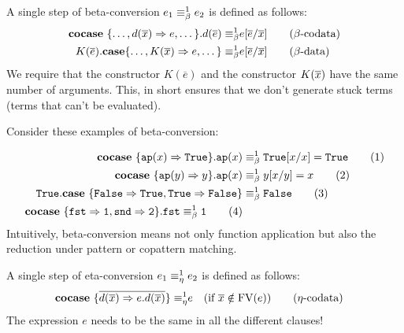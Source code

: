 \documentclass[twoside,12pt,a4paper]{article}
\begin{document}
\begin{definition} \label{sec:betaconv}
    A single step of beta-conversion $e_1 \equiv_{\beta}^1 e_2$ is defined as follows:
    \begin{align*}
        \textbf{cocase}\ \{\dots,d(\overline{x}) \Rightarrow e, \dots\}.d(\overline{e})
        \equiv_{\beta}^1 & e[\overline{e}/\overline{x}]  
        \tag{$\beta$-codata}\\
        K(\overline{e}).\textbf{case}\{\dots,K(\overline{x})\Rightarrow e,\dots\}
        \equiv_{\beta}^1 & e[\overline{e}/\overline{x}] 
        \tag{$\beta$-data}
    \end{align*}
    We require that the constructor $K(\overline{e})$ and the constructor $K(\overline{x})$ have the same number of arguments.
    This, in short ensures that we don't generate stuck terms (terms that can't be evaluated).
\end{definition}
Consider these examples of beta-conversion:
\begin{example}
    \begin{align*}
        \textbf{cocase}\ \{\texttt{ap}(x)\Rightarrow \mathtt{True}\}.\texttt{ap}(x)&\equiv_{\beta}^1 \mathtt{True}[x/x] = \mathtt{True} 
        \tag{1}\\
        \textbf{cocase}\ \{\texttt{ap}(y)\Rightarrow y\}.\texttt{ap}(x) &\equiv_{\beta}^1 y[x/y]= x
        \tag{2}\\
        \mathtt{True}.\textbf{case}\ \{\mathtt{False}\Rightarrow \mathtt{True}, \mathtt{True} \Rightarrow \mathtt{False}\}&\equiv_{\beta}^1\mathtt{False}
        \tag{3}\\
        \textbf{cocase}\ \{\mathtt{fst\Rightarrow 1, snd\Rightarrow 2}\}.\mathtt{fst}\equiv_{\beta}^1 \mathtt{1}
        \tag{4}
    \end{align*}
    Intuitively, beta-conversion means not only function application but also the reduction under pattern or copattern matching. %
\end{example}

\begin{definition}
    A single step of eta-conversion $e_1 \equiv_{\eta}^1 e_2$ is defined as follows:
    \begin{align*}
        \textbf{cocase}\ \{\overline{d(\overline{x})\Rightarrow e.d(\overline{x})}\}
        \equiv_{\eta}^1 & e \quad (\text{if } \overline{x}\notin \text{FV}(e)) \tag{$\eta$-codata}
    \end{align*}
    The expression $e$ needs to be the same in all the different clauses!
\end{definition}
\end{document}
